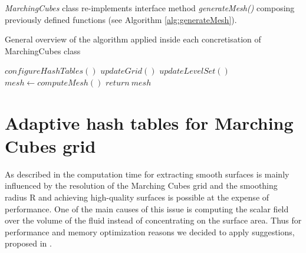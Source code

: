 \emph{MarchingCubes} class re-implements interface method \emph{generateMesh()} composing previously defined functions (see Algorithm \ref{alg:generateMesh}).

\begin{algorithm}
	\scriptsize
	\caption{General overview of the algorithm applied inside each concretisation of MarchingCubes class}
	\label{alg:generateMesh}
	\begin{algorithmic}
		\State $configureHashTables()$
		\State $updateGrid()$
		\State $updateLevelSet()$
		\State $mesh \gets computeMesh()$ 
		\State $return\ mesh$
	\end{algorithmic}
\end{algorithm}

\section{Adaptive hash tables for Marching Cubes grid}
As described in \cite{Akinchi} the computation time for extracting smooth surfaces is mainly influenced by
the resolution of the Marching Cubes grid and the smoothing radius R and achieving high-quality surfaces is possible at the expense of performance. One of the main causes of this issue is computing the scalar field over the volume of the fluid instead of concentrating on the surface area. Thus for performance and memory optimization reasons we decided to apply suggestions, proposed in \cite{Akinchi}.

